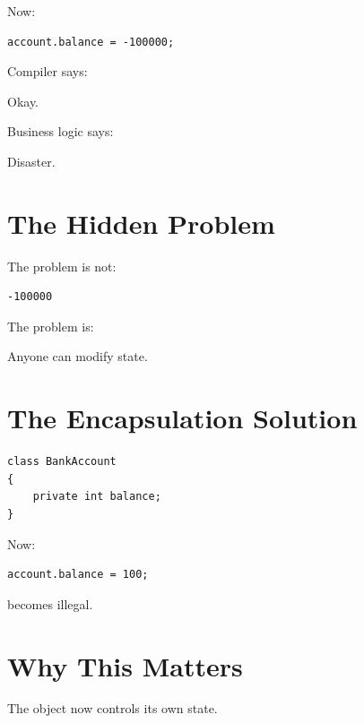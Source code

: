 \documentclass[11pt,a4paper]{book}
\begin{document}
Now:

\begin{verbatim}
account.balance = -100000;
\end{verbatim}

Compiler says:

\begin{center}
Okay.
\end{center}

Business logic says:

\begin{center}
Disaster.
\end{center}


\section{The Hidden Problem}

The problem is not:

\begin{verbatim}
-100000
\end{verbatim}

The problem is:

\begin{center}
Anyone can modify state.
\end{center}


\section{The Encapsulation Solution}

\begin{verbatim}
class BankAccount
{
    private int balance;
}
\end{verbatim}

Now:

\begin{verbatim}
account.balance = 100;
\end{verbatim}

becomes illegal.


\section{Why This Matters}

\begin{idea}

The object now controls its own state.

\end{idea}
\end{document}
